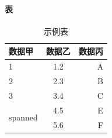 \documentclass{article}
\begin{document}
        \paragraph{表}
        \begin{table}[h!]
            \begin{center}
                \caption{示例表}
                \label{table:extab1}
                \begin{tabular}{l|c|r} %
                    \hline
                    \textbf{数据甲} & \textbf{数据乙} & \textbf{数据丙}\\
                    \hline
                    1 & 1.2 & A\\
                    2 & 2.3 & B\\
                    3 & 3.4 & C\\
                    \hline
                    \multirow{2}{*}{spanned} & 4.5 & E\\
                    & 5.6 & F\\
                \end{tabular}
            \end{center}
        \end{table}
\end{document}
